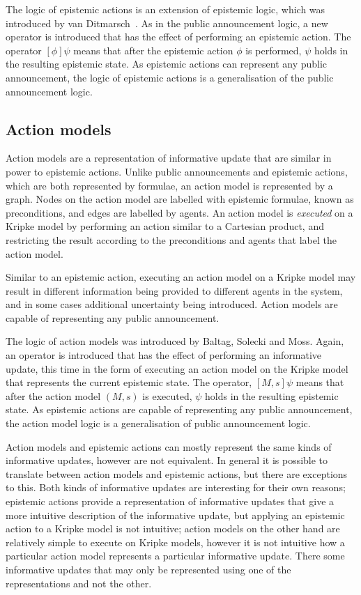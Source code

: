 The logic of epistemic actions is an extension of epistemic logic, which was
introduced by van
Ditmarsch~\cite{vanditmarsch1999logic,vanditmarsch2001knowledge,vanditmarsch2007dynamic}.
As in the public announcement logic, a new operator is introduced that has the
effect of performing an epistemic action. The operator $[\phi] \psi$ means that
after the epistemic action $\phi$ is performed, $\psi$ holds in the resulting
epistemic state. As epistemic actions can represent any public announcement, the
logic of epistemic actions is a generalisation of the public announcement logic.

\subsection{Action models}

Action models are a representation of informative update that are similar in
power to epistemic actions. Unlike public announcements and epistemic actions,
which are both represented by formulae, an action model is represented by a
graph. Nodes on the action model are labelled with epistemic formulae, known as
preconditions, and edges are labelled by agents. An action model is {\em
executed} on a Kripke model by performing an action similar to a Cartesian
product, and restricting the result according to the preconditions and agents
that label the action model. 

Similar to an epistemic action, executing an action model on a Kripke model may
result in different information being provided to different agents in the
system, and in some cases additional uncertainty being introduced. Action models
are capable of representing any public announcement.

The logic of action models was introduced by Baltag, Solecki and
Moss\cite{baltag2004logics}. Again, an operator is introduced that has the
effect of performing an informative update, this time in the form of executing an
action model on the Kripke model that represents the current epistemic state.
The operator, $[M,s]\psi$ means that after the action model $(M, s)$ is
executed, $\psi$ holds in the resulting epistemic state. As epistemic actions
are capable of representing any public announcement, the action model logic is
a generalisation of public announcement logic.

Action models and epistemic actions can mostly represent the same kinds of
informative updates, however are not equivalent. In general it is possible to
translate between action models and epistemic actions, but there are exceptions
to this. %
Both kinds of informative updates are interesting for their own reasons;
epistemic actions provide a representation of informative updates that give a
more intuitive description of the informative update, but applying an
epistemic action to a Kripke model is not intuitive; action models on the other
hand are relatively simple to execute on Kripke models, however it is not
intuitive how a particular action model represents a particular informative
update. There some informative updates that may only be represented using one of
the representations and not the other.

